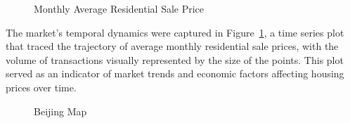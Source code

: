\documentclass[
  letterpaper,
  DIV=11,
  numbers=noendperiod]{scrartcl}
\begin{document}
\begin{figure}


\caption{\label{fig-monthly-price}Monthly Average Residential Sale
Price}

\end{figure}%

The market's temporal dynamics were captured in
Figure~\ref{fig-monthly-price}, a time series plot that traced the
trajectory of average monthly residential sale prices, with the volume
of transactions visually represented by the size of the points. This
plot served as an indicator of market trends and economic factors
affecting housing prices over time.

\begin{figure}


\caption{\label{fig-beijing-map}Beijing Map}

\end{figure}%
\end{document}

